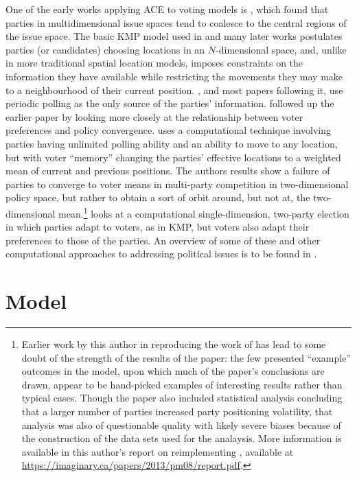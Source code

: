 \documentclass[12pt]{article}
\numberwithin{equation}{subsection}
\begin{document}
One of the early works applying ACE to voting models is \citet{KMP92}, which found that parties in
multidimensional issue spaces tend to coalesce to the central regions of the issue space.  The basic
KMP model used in \citet{KMP92} and many later works postulates parties (or candidates) choosing
locations in an $N$-dimensional space, and, unlike in more traditional spatial location models,
imposes constraints on the information they have available while restricting the movements they may
make to a neighbourhood of their current position.  \citet{KMP92}, and most papers following it, use
periodic polling as the only source of the parties' information.  \citet{KMP98} followed up the
earlier paper by looking more closely at the relationship between voter preferences and policy
convergence.  \citet{Plumper08} uses a computational technique involving parties having unlimited
polling ability and an ability to move to any location, but with voter ``memory'' changing the
parties' effective locations to a weighted mean of current and previous positions.  The authors
results show a failure of parties to converge to voter means in multi-party competition in
two-dimensional policy space, but rather to obtain a sort of orbit around, but not at, the
two-dimensional mean.\footnote{
    Earlier work by this author in reproducing the work of \citet{Plumper08} has lead to some doubt
    of the strength of the results of the paper: the few presented ``example'' outcomes in the
    model, upon which much of the paper's conclusions are drawn, appear to be hand-picked examples
    of interesting results rather than typical cases.  Though the paper also included statistical
    analysis concluding that a larger number of parties increased party positioning volatility, that
    analysis was also of questionable quality with likely severe biases because of the construction
    of the data sets used for the analaysis.  More information is available in this author's report
    on reimplementing \citet{Plumper08}, available at
\url{https://imaginary.ca/papers/2013/pm08/report.pdf}.}
\citet{Jackson03} looks at a computational single-dimension, two-party election in which parties
adapt to voters, as in KMP, but voters also adapt their preferences to those of the parties.  An
overview of some of these and other computational approaches to addressing political issues is to be
found in \citet{Handbook29}.

\section{Model}\label{s:model}
\end{document}
